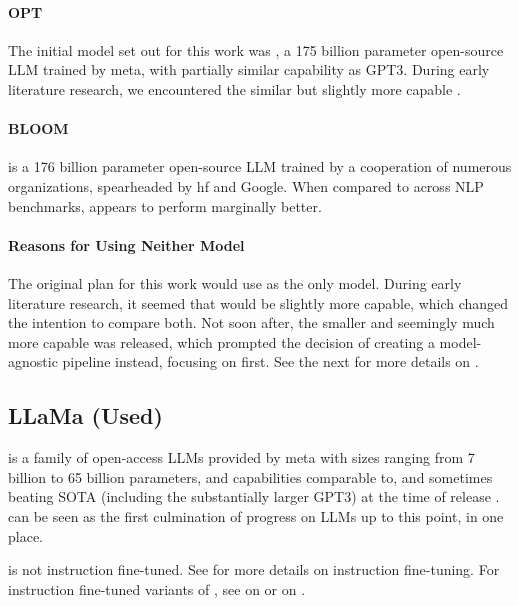 \paragraph{OPT}\label{par:opt}\label{sub:OPT}
The initial model set out for this work was  \cite{zhang_opt_2022}, a 175 billion parameter open-source \gls{LLM} trained by \gls{meta}, with partially similar capability as \gls{GPT3}. During early literature research, we encountered the similar but slightly more capable .

\paragraph{BLOOM}\label{par:bloom}\label{sub:BLOOM}
 \cite{workshop_bloom_2022} is a 176 billion parameter open-source \gls{LLM} trained by a cooperation of numerous organizations, spearheaded by \gls{hf} and \gls{Google}. When compared to  across \gls{NLP} benchmarks,  appears to perform marginally better.

\paragraph{Reasons for Using Neither Model}
The original plan for this work would use  as the only model. During early literature research, it seemed that  would be slightly more capable, which changed the intention to compare both.
Not soon after, the smaller and seemingly much more capable  was released, which prompted the decision of creating a model-agnostic pipeline instead, focusing on  first.
See the next  for more details on .

\subsection{LLaMa (Used)}\label{sub:llama}
 is a family of open-access \glspl{LLM} provided by \gls{meta} with sizes ranging from 7 billion to 65 billion parameters, and capabilities comparable to, and sometimes beating \gls{SOTA} (including the substantially larger \gls{GPT3}) at the time of release \cite{touvron_llama_2023}.
 can be seen as the first culmination of progress on \glspl{LLM} up to this point, in one place.

 is not instruction fine-tuned. See  for more details on instruction fine-tuning.
For instruction fine-tuned variants of , see  on  or  on .

